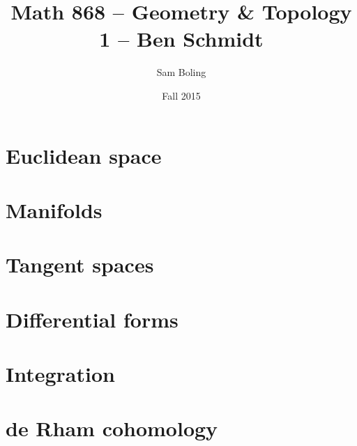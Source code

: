 \documentclass{report}
\title{Math 868 -- Geometry \& Topology 1 -- Ben Schmidt}
\author{Sam Boling}
\date{Fall 2015}
\begin{document}
\maketitle

\chapter{Euclidean space}



\chapter{Manifolds}







\chapter{Tangent spaces}



\chapter{Differential forms}


\chapter{Integration}




\chapter{de Rham cohomology}

\end{document}
